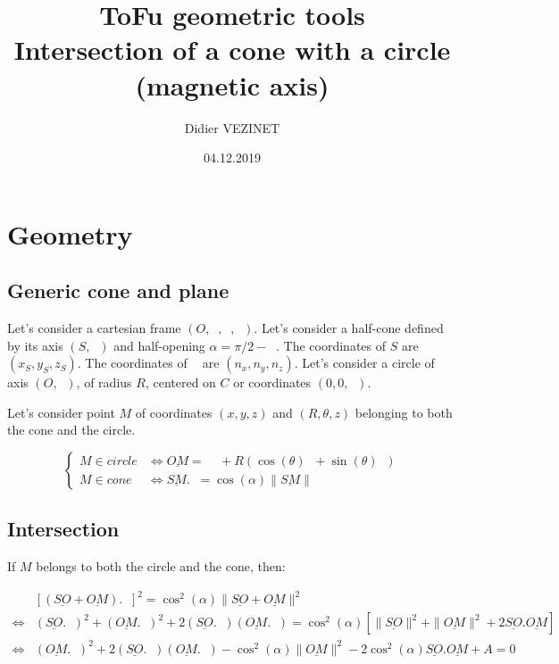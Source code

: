 \documentclass[a4paper,11pt,twoside,titlepage,openright]{book}
\numberwithin{equation}{section}
\newcommand{\ud}[1]{\underline{#1}}
\newcommand{\lt}{\left}
\newcommand{\rt}{\right}
\newcommand{\lra}{\Leftrightarrow}
\DeclareMathOperator{\n}{\underline{n}}
\DeclareMathOperator{\ex}{\underline{e}_x}
\DeclareMathOperator{\ey}{\underline{e}_y}
\DeclareMathOperator{\ez}{\underline{e}_z}
\DeclareMathOperator{\bragg}{\theta_{bragg}}
\DeclareMathOperator{\Z}{Z_C}
\begin{document}
\title{ToFu geometric tools\\ Intersection of a cone with a circle (magnetic axis)}
\author{Didier VEZINET}
\date{04.12.2019}
\maketitle

\tableofcontents

\chapter{Geometry}
\label{chap:Geometry}

\section{Generic cone and plane}

Let's consider a cartesian frame $(O, \ex, \ey, \ez)$.
Let's consider a half-cone defined by its axis $(S, \n)$ and half-opening $\alpha = \pi/2 - \bragg$.
The coordinates of $S$ are $(x_S, y_S, z_S)$.
The coordinates of $\n$ are $(n_x, n_y, n_z)$.
Let's consider a circle of axis $(O, \ez)$, of radius $R$, centered on $C$ or coordinates $(0, 0, \Z)$.

Let's consider point $M$ of coordinates $(x, y, z)$ and $(R, \theta, z)$ belonging to both the cone and the circle.


$$
\lt\{
	\begin{array}{ll}
		M \in circle & \lra \ud{OM} = \Z\ez + R(\cos(\theta)\ex + \sin(\theta)\ey)\\
		M \in cone & \lra \ud{SM}.\n = \cos(\alpha)\|\ud{SM}\|
	\end{array}
\rt.
$$



\section{Intersection}

If $M$ belongs to both the circle and the cone, then:

$$
\begin{array}{ll}
	& \lt[\lt(\ud{SO}+\ud{OM}\rt).\n\rt]^2 = \cos^2(\alpha)\|\ud{SO} + \ud{OM}\|^2\\
	\lra &
	\lt(\ud{SO}.\n\rt)^2 + \lt(\ud{OM}.\n\rt)^2 + 2\lt(\ud{SO}.\n\rt)\lt(\ud{OM}.\n\rt)
	= \cos^2(\alpha)\lt[\|\ud{SO}\|^2 + \|\ud{OM}\|^2 + 2\ud{SO}.\ud{OM}\rt]\\
	\lra &
	\lt(\ud{OM}.\n\rt)^2 + 2\lt(\ud{SO}.\n\rt)\lt(\ud{OM}.\n\rt)
	- \cos^2(\alpha)\|\ud{OM}\|^2 - 2\cos^2(\alpha)\ud{SO}.\ud{OM} + A = 0
\end{array}
$$
\end{document}
